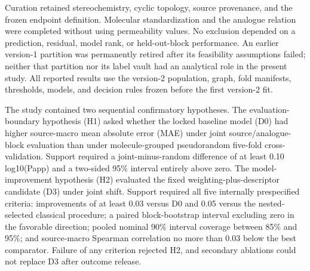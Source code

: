 \documentclass[referee,lineno,pdflatex,sn-vancouver-num]{sn-jnl}
\begin{document}
Curation retained stereochemistry, cyclic topology, source provenance, and the frozen endpoint definition. Molecular standardization and the analogue relation were completed without using permeability values. No exclusion depended on a prediction, residual, model rank, or held-out-block performance. An earlier version-1 partition was permanently retired after its feasibility assumptions failed; neither that partition nor its label vault had an analytical role in the present study. All reported results use the version-2 population, graph, fold manifests, thresholds, models, and decision rules frozen before the first version-2 fit.

The study contained two sequential confirmatory hypotheses. The evaluation-boundary hypothesis (H1) asked whether the locked baseline model (D0) had higher source-macro mean absolute error (MAE) under joint source/analogue-block evaluation than under molecule-grouped pseudorandom five-fold cross-validation. Support required a joint-minus-random difference of at least 0.10 log10(Papp) and a two-sided 95\% interval entirely above zero. The model-improvement hypothesis (H2) evaluated the fixed weighting-plus-descriptor candidate (D3) under joint shift. Support required all five internally prespecified criteria: improvements of at least 0.03 versus D0 and 0.05 versus the nested-selected classical procedure; a paired block-bootstrap interval excluding zero in the favorable direction; pooled nominal 90\% interval coverage between 85\% and 95\%; and source-macro Spearman correlation no more than 0.03 below the best comparator. Failure of any criterion rejected H2, and secondary ablations could not replace D3 after outcome release.
\end{document}
